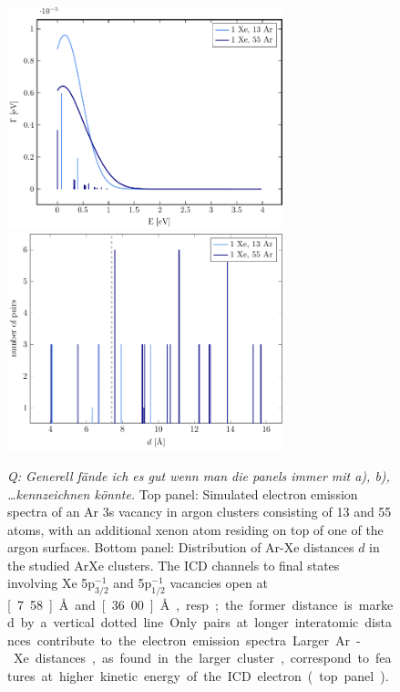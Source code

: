 %
\begin{figure}[H]
 \centering
 \includegraphics[width=8.0cm]{pics/surf.pdf}\\
 \includegraphics[width=8.0cm]{pics/R_comp.pdf}
 \caption{
 {\it Q: Generell f\"ande ich es gut wenn man die panels immer mit a), b), \dots kennzeichnen k\"onnte.}
 Top panel: Simulated electron emission spectra of an Ar 3s vacancy in 
          argon clusters
          consisting of 13 and 55 atoms, with an additional xenon atom residing
          on top of one of the argon surfaces.
          Bottom panel: Distribution of Ar-Xe distances $d$ in the studied ArXe
          clusters. The ICD channels to final states involving Xe 5p$_{3/2}^{-1}$ and 
          5p$_{1/2}^{-1}$ vacancies open at \unit[7.58]{\AA} and
          \unit[36.00]{\AA}, resp.; the former distance is marked by a vertical dotted line. 
          Only pairs at longer interatomic
          distances contribute to the electron emission spectra.
          Larger Ar-Xe distances, as found in the larger cluster,
          correspond to features at higher kinetic energy of
          the ICD electron (top panel).}
 \label{figure:surf}
\end{figure}





